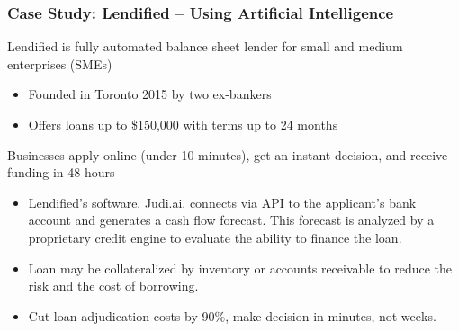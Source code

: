 \documentclass[aspectratio=169,xcolor=dvipsnames]{beamer}
\begin{document}
\begin{frame}
\frametitle{Case Study: Lendified – Using Artificial Intelligence}


Lendified is fully automated balance sheet lender for small and medium enterprises (SMEs)
\begin{itemize}
    \item Founded in Toronto 2015 by two ex-bankers
    \item Offers loans up to \$150,000 with terms up to 24 months
\end{itemize}

\medskip 


Businesses apply online (under 10 minutes), get an instant decision, and receive funding in 48 hours
\begin{itemize}
    \item Lendified’s software, Judi.ai, connects via API to the applicant’s bank account and generates a cash flow forecast. This forecast is analyzed by a proprietary credit engine to evaluate the ability to finance the loan.
    \item Loan may be collateralized by inventory or accounts receivable to reduce the risk and the cost of borrowing.
    \item Cut loan adjudication costs by 90\%, make decision in minutes, not weeks.
\end{itemize}


\end{frame} 








\end{document}
